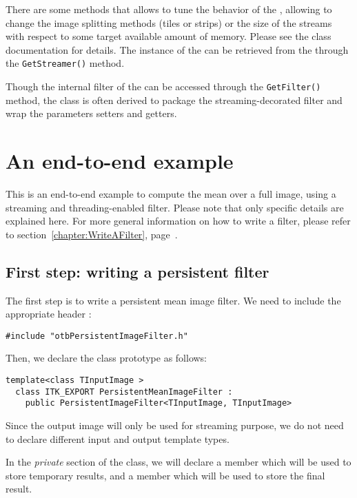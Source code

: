 There are some methods that allows to tune the behavior of the
, allowing to change the
image splitting methods (tiles or strips) or the size of the streams
with respect to some target available amount of memory. Please see the
class documentation for details. The instance of the
 can be retrieved from the
 through the
\verb?GetStreamer()? method.

Though the internal filter of the
 can be accessed
through the \verb?GetFilter()? method, the class is often derived to
package the streaming-decorated filter and wrap the parameters setters
and getters.

\section{An end-to-end example}

This is an end-to-end example to compute the mean over a full image,
using a streaming and threading-enabled filter. Please note that only
specific details are explained here. For more general information on
how to write a filter, please refer to
section~\ref{chapter:WriteAFilter}, page~\pageref{chapter:WriteAFilter}.

\subsection{First step: writing a persistent filter}

The first step is to write a persistent mean image filter. We need to
include the appropriate header :

\begin{verbatim}
#include "otbPersistentImageFilter.h"
\end{verbatim}

Then, we declare the class prototype as follows:

\begin{verbatim}
template<class TInputImage >
  class ITK_EXPORT PersistentMeanImageFilter :
    public PersistentImageFilter<TInputImage, TInputImage>
\end{verbatim}

Since the output image will only be used for streaming purpose, we do
not need to declare different input and output template types.

In the \emph{private} section of the class, we will declare a member which
will be used to store temporary results, and a member which will be
used to store the final result.

